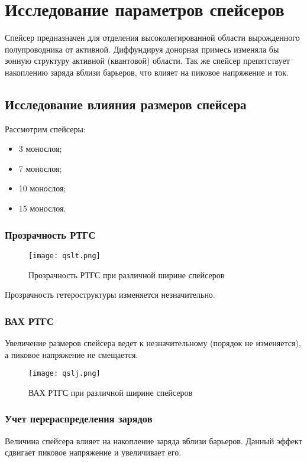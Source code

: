 \section{Исследование параметров спейсеров}
Спейсер предназначен для отделения высоколегированной области вырожденного полупроводника от активной. Диффундируя донорная примесь изменяла бы зонную структуру активной (квантовой) области. Так же спейсер препятствует накоплению заряда вблизи барьеров, что влияет на пиковое напряжение и ток.
\subsection{Исследование влияния размеров спейсера}
Рассмотрим спейсеры: 
\begin{itemize}
	\item 3 монослоя;
	\item 7 монослоя;
	\item 10 монослоя;
	\item 15 монослоя.
\end{itemize}
\subsubsection{Прозрачность РТГС}

\begin{figure}[h]
	\centering
	\texttt{[image: qslt.png]}
	\caption{Прозрачность РТГС при различной ширине спейсеров}
	\label{fig:qslt}
\end{figure}

Прозрачность гетероструктуры изменяется незначительно.

\subsubsection{ВАХ РТГС}
Увеличение размеров спейсера ведет к незначительному (порядок не изменяется), а пиковое напряжение не смещается.

\begin{figure}[h!]
	\centering
	\texttt{[image: qslj.png]}
	\caption{ВАХ РТГС при различной ширине спейсеров}
	\label{fig:qslj}
\end{figure}


\subsubsection{Учет перераспределения зарядов}
Величина спейсера влияет на накопление заряда вблизи барьеров. Данный эффект сдвигает пиковое напряжение и увеличивает его.

